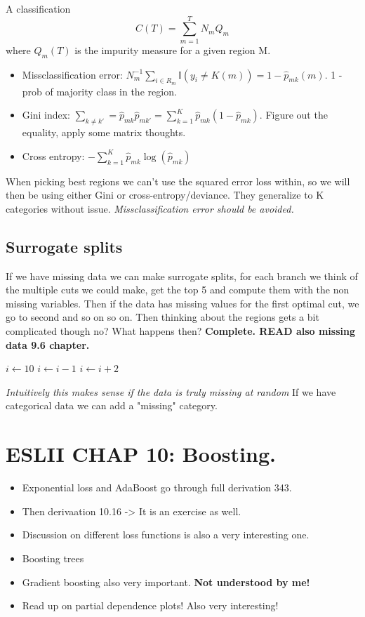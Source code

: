 \documentclass{article}
\begin{document}
A classification $$C(T) = \sum_{m=1}^{T}N_m Q_m$$ where $Q_m(T)$ is the impurity measure for a given region M.
\begin{itemize}
    \item Missclassification error: $N_m^{-1}\sum_{i \in R_m} \mathbb{I}(y_i \neq K(m)) = 1 - \hat{p}_{mk}(m)$. 1 - prob of majority class in the region. 
    \item Gini index: $\sum_{k \neq k'} = \hat{p}_{mk}\hat{p}_{mk'} = \sum_{k=1}^{K}\hat{p}_{mk}(1-\hat{p}_{mk})$. Figure out the equality, apply some matrix thoughts.
    \item Cross entropy: $-\sum_{k=1}^{K}\hat{p}_{mk}\log(\hat{p}_{mk})$
\end{itemize}


When picking best regions we can't use the squared error loss within, so we will then be using either Gini or cross-entropy/deviance. They generalize to K categories without issue. \textit{ Missclassification error should be avoided.}  

\subsection*{Surrogate splits}
If we have missing data we can make surrogate splits, for each branch we think of the multiple cuts we could make, get the top 5 and compute them with the non missing variables.
Then if the data has missing values for the first optimal cut, we go to second and so on so on. Then thinking about the regions gets a bit complicated though no? 
What happens then? \textbf{Complete. READ also missing data 9.6 chapter.}

\begin{algorithmic}
\State $i \gets 10$
    \State $i \gets i-1$
\Else
        \State $i \gets i+2$
    \EndIf
\EndIf 
\end{algorithmic}


\textit{Intuitively this makes sense if the data is truly missing at random}
If we have categorical data we can add a "missing" category.

\section*{ESLII CHAP 10: Boosting.}
\begin{itemize}
    \item Exponential loss and AdaBoost go through full derivation 343.
    \item Then derivaation 10.16 -> It is an exercise as well.
    \item Discussion on different loss functions is also a very interesting one.
    \item Boosting trees 
    \item Gradient boosting also very important. \textbf{Not understood by me!}
    \item Read up on partial dependence plots! Also very interesting!
\end{itemize}
\end{document}
